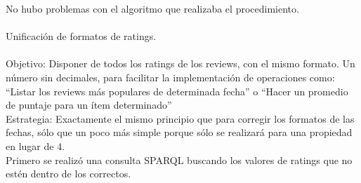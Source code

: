No hubo problemas con el algoritmo que realizaba el procedimiento.
\\
\\
Unificación de formatos de ratings.\\
\\
Objetivo: Disponer de todos los ratings de los reviews, con el mismo formato. Un número sin decimales, para facilitar la implementación 
de operaciones como: ``Listar los reviews más populares de determinada fecha'' o ``Hacer un promedio de puntaje para un ítem determinado''
\\
Estrategia: Exactamente el mismo principio que para corregir los formatos de las fechas, sólo que un poco más simple porque sólo se realizará 
para una propiedad en lugar de 4.
\\
Primero se realizó una consulta SPARQL buscando los valores de ratings que no estén dentro de los correctos. \\

